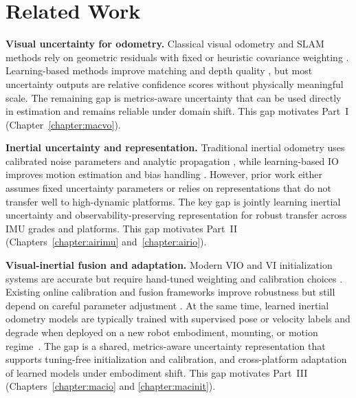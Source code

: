 \section{Related Work}
\label{sec:ch2_related_works}

\textbf{Visual uncertainty for odometry.}
Classical visual odometry and SLAM methods rely on geometric residuals with fixed or heuristic covariance weighting \cite{mur2015orb, engel2014lsd, qin2018vins}.
Learning-based methods improve matching and depth quality \cite{sarlin2020superglue, teed2021droid, wang2023dust3r}, but most uncertainty outputs are relative confidence scores without physically meaningful scale.
The remaining gap is metrics-aware uncertainty that can be used directly in estimation and remains reliable under domain shift.
This gap motivates Part~I (Chapter~\ref{chapter:macvo}).

\textbf{Inertial uncertainty and representation.}
Traditional inertial odometry uses calibrated noise parameters and analytic propagation \cite{forster2015imu, tedaldi2014robust}, while learning-based IO improves motion estimation and bias handling \cite{chen2018ionet, herath2020ronin, liu2020tlio}.
However, prior work either assumes fixed uncertainty parameters or relies on representations that do not transfer well to high-dynamic platforms.
The key gap is jointly learning inertial uncertainty and observability-preserving representation for robust transfer across IMU grades and platforms.
This gap motivates Part~II (Chapters~\ref{chapter:airimu} and~\ref{chapter:airio}).

\textbf{Visual-inertial fusion and adaptation.}
Modern VIO and VI initialization systems are accurate but require hand-tuned weighting and calibration choices \cite{campos2021orb, qin2018vins, geneva2020openvins}.
Existing online calibration and fusion frameworks improve robustness but still depend on careful parameter adjustment \cite{huang2018online, zhao2021super}.
At the same time, learned inertial odometry models are typically trained with supervised pose or velocity labels and degrade when deployed on a new robot embodiment, mounting, or motion regime~\cite{liu2020tlio, cioffi2023learned}.
The gap is a shared, metrics-aware uncertainty representation that supports tuning-free initialization and calibration, and cross-platform adaptation of learned models under embodiment shift.
This gap motivates Part~III (Chapters~\ref{chapter:macio} and \ref{chapter:macinit}).
